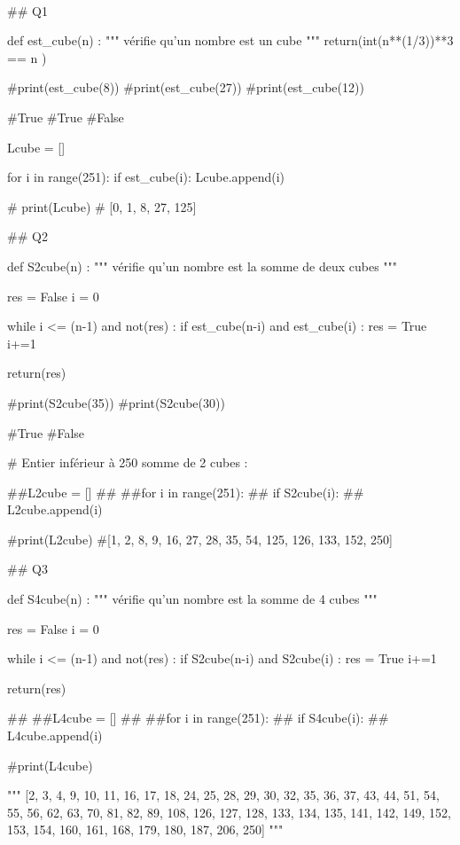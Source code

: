 \documentclass[10pt,fleqn]{article} %
\begin{document}
\begin{corrige}
$\quad$
\begin{python}


## Q1

def est_cube(n) :
    """ vérifie qu'un nombre est un cube """
    return(int(n**(1/3))**3 == n )

#print(est_cube(8))
#print(est_cube(27))
#print(est_cube(12))

#True
#True
#False

Lcube = []

for i in range(251):
    if est_cube(i):
        Lcube.append(i)

# print(Lcube)
# [0, 1, 8, 27, 125]

        
## Q2

def S2cube(n) :
    """ vérifie qu'un nombre est la somme de deux cubes """
    
    res = False
    i = 0
    
    while i <= (n-1) and not(res) :
        if est_cube(n-i) and est_cube(i) :
            res = True
        i+=1
        
    return(res)

#print(S2cube(35))
#print(S2cube(30))

#True
#False



# Entier inférieur à 250 somme de 2 cubes :

##L2cube = []
##
##for i in range(251):
##    if S2cube(i):
##        L2cube.append(i)

#print(L2cube)
#[1, 2, 8, 9, 16, 27, 28, 35, 54, 125, 126, 133, 152, 250]


## Q3

def S4cube(n) :
    """ vérifie qu'un nombre est la somme de 4 cubes """
    
    res = False
    i = 0
    
    while i <= (n-1) and not(res) :
        if S2cube(n-i) and S2cube(i) :
            res = True
        i+=1
        
    return(res)

##
##L4cube = []
##
##for i in range(251):
##    if S4cube(i):
##        L4cube.append(i)

#print(L4cube)

""" [2, 3, 4, 9, 10, 11, 16, 17, 18, 24, 25, 28, 29, 30, 32, 35, 36, 37, 43, 44, 51, 
      54, 55, 56, 62, 63, 70, 81, 82, 89, 108, 126, 127, 128, 133, 134, 135, 141, 
       142, 149, 152, 153, 154, 160, 161, 168, 179, 180, 187, 206, 250]
"""


\end{python}
\end{corrige}
\end{document}
